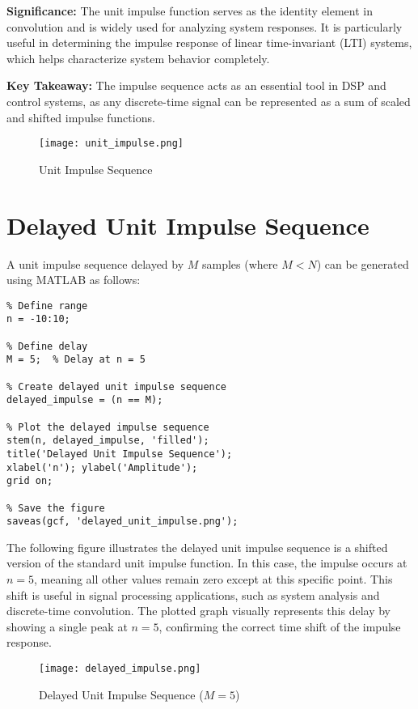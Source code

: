\documentclass[a4paper,12pt]{article}
\begin{document}
\textbf{Significance:} The unit impulse function serves as the identity element in convolution and is widely used for analyzing system responses. It is particularly useful in determining the impulse response of linear time-invariant (LTI) systems, which helps characterize system behavior completely.

\textbf{Key Takeaway:} The impulse sequence acts as an essential tool in DSP and control systems, as any discrete-time signal can be represented as a sum of scaled and shifted impulse functions.
\begin{figure}[H]
    \centering
    \texttt{[image: unit\_impulse.png]} %
    \caption{Unit Impulse Sequence}
    \label{fig:unit_impulse}
\end{figure}
\section{Delayed Unit Impulse Sequence}

A unit impulse sequence delayed by \(M\) samples (where \(M < N\)) can be generated using MATLAB as follows:

\begin{verbatim}
% Define range
n = -10:10;  

% Define delay
M = 5;  % Delay at n = 5

% Create delayed unit impulse sequence
delayed_impulse = (n == M);

% Plot the delayed impulse sequence
stem(n, delayed_impulse, 'filled');
title('Delayed Unit Impulse Sequence');
xlabel('n'); ylabel('Amplitude');
grid on;

% Save the figure
saveas(gcf, 'delayed_unit_impulse.png');
\end{verbatim}

The following figure illustrates the delayed unit impulse sequence is a shifted version of the standard unit impulse function. In this case, the impulse occurs at \( n = 5 \), meaning all other values remain zero except at this specific point. This shift is useful in signal processing applications, such as system analysis and discrete-time convolution. The plotted graph visually represents this delay by showing a single peak at \( n = 5 \), confirming the correct time shift of the impulse response.

\begin{figure}[H]
    \centering
    \texttt{[image: delayed\_impulse.png]} %
    \caption{Delayed Unit Impulse Sequence (\(M = 5\))}
    \label{fig:delayed_impulse}
\end{figure}
\end{document}
